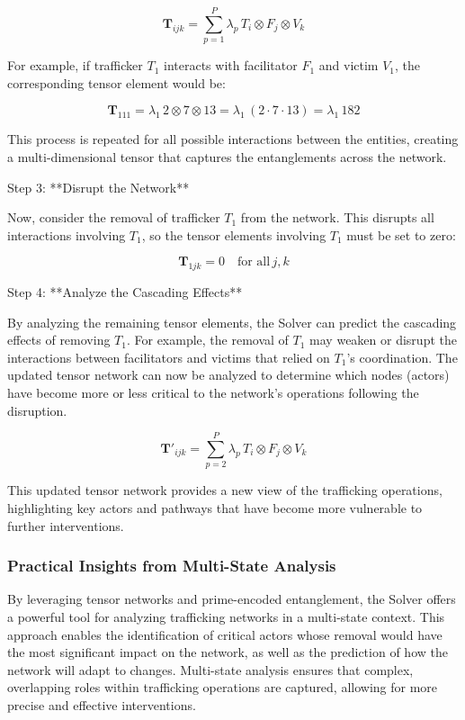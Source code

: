 \documentclass[%
 preprint, linenumbers,
 amsmath,amssymb,
 aps, physrev,
]{revtex4-2}
\begin{document}
\[
\mathbf{T}_{ijk} = \sum_{p=1}^{P} \lambda_p \, T_i \otimes F_j \otimes V_k
\]

For example, if trafficker \(T_1\) interacts with facilitator \(F_1\) and victim \(V_1\), the corresponding tensor element would be:

\[
\mathbf{T}_{111} = \lambda_1 \, 2 \otimes 7 \otimes 13 = \lambda_1 \, (2 \cdot 7 \cdot 13) = \lambda_1 \, 182
\]

This process is repeated for all possible interactions between the entities, creating a multi-dimensional tensor that captures the entanglements across the network.

Step 3: **Disrupt the Network**

Now, consider the removal of trafficker \(T_1\) from the network. This disrupts all interactions involving \(T_1\), so the tensor elements involving \(T_1\) must be set to zero:

\[
\mathbf{T}_{1jk} = 0 \quad \text{for all} \, j, k
\]

Step 4: **Analyze the Cascading Effects**

By analyzing the remaining tensor elements, the Solver can predict the cascading effects of removing \(T_1\). For example, the removal of \(T_1\) may weaken or disrupt the interactions between facilitators and victims that relied on \(T_1\)’s coordination. The updated tensor network can now be analyzed to determine which nodes (actors) have become more or less critical to the network’s operations following the disruption.

\[
\mathbf{T}'_{ijk} = \sum_{p=2}^{P} \lambda_p \, T_i \otimes F_j \otimes V_k
\]

This updated tensor network provides a new view of the trafficking operations, highlighting key actors and pathways that have become more vulnerable to further interventions.

\subsubsection{Practical Insights from Multi-State Analysis}

By leveraging tensor networks and prime-encoded entanglement, the Solver offers a powerful tool for analyzing trafficking networks in a multi-state context. This approach enables the identification of critical actors whose removal would have the most significant impact on the network, as well as the prediction of how the network will adapt to changes. Multi-state analysis ensures that complex, overlapping roles within trafficking operations are captured, allowing for more precise and effective interventions.
\end{document}
